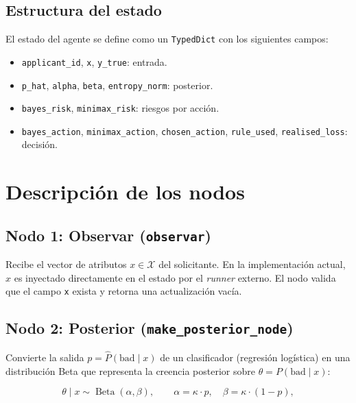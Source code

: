 \documentclass[11pt,a4paper]{article}
\theoremstyle{definition}
\newcommand{\X}{\mathcal{X}}
\newcommand{\Beta}{\operatorname{Beta}}
\begin{document}
\subsection*{Estructura del estado}

El estado del agente se define como un \texttt{TypedDict} con los siguientes
campos:

\begin{itemize}
	\item \texttt{applicant\_id}, \texttt{x}, \texttt{y\_true}: entrada.
	\item \texttt{p\_hat}, \texttt{alpha}, \texttt{beta}, \texttt{entropy\_norm}: posterior.
	\item \texttt{bayes\_risk}, \texttt{minimax\_risk}: riesgos por acción.
	\item \texttt{bayes\_action}, \texttt{minimax\_action}, \texttt{chosen\_action},
	      \texttt{rule\_used}, \texttt{realised\_loss}: decisión.
\end{itemize}

\section{Descripción de los nodos}

\subsection{Nodo 1: Observar (\texttt{observar})}

Recibe el vector de atributos $x\in\X$ del solicitante. En la implementación
actual, $x$ es inyectado directamente en el estado por el \emph{runner}
externo. El nodo valida que el campo \texttt{x} exista y retorna una
actualización vacía.

\subsection{Nodo 2: Posterior (\texttt{make\_posterior\_node})}

Convierte la salida $p = \hat{P}(\text{bad}\mid x)$ de un clasificador
(regresión logística) en una distribución Beta que representa la creencia
posterior sobre $\theta = P(\text{bad}\mid x)$:

\begin{equation}\label{eq:moment-match}
	\theta \mid x \sim \Beta(\alpha,\beta),\qquad
	\alpha = \kappa \cdot p,\quad \beta = \kappa \cdot (1-p),
\end{equation}
\end{document}
